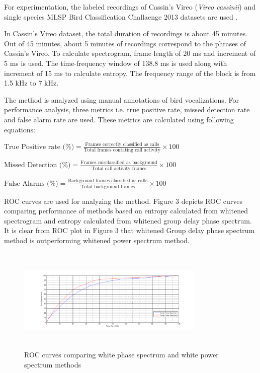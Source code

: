 \documentclass[a4paper]{article}
\begin{document}
For experimentation, the labeled recordings of Cassin’s Vireo (\textit{Vireo cassinii}) and single species MLSP Bird Classification Challaenge 2013 datasets are used \cite{data}. 

In Cassin's Vireo dataset, the total duration of recordings is about 45 minutes. Out of 45 minutes, about 5 minutes of recordings correspond to the phrases of Cassin's Vireo. To calculate spectrogram, frame length of 20 ms and increment of  
5 ms is used. The time-frequency window of 138.8 ms is used along with increment of 15 ms to calculate entropy. The frequency range of the block is from 1.5 kHz to 7 kHz.  

The method is analyzed using manual annotations of bird vocalizations. For performance analysis, three metrics i.e. true positive rate, missed detection rate and false alarm rate are used. These metrics are calculated using following equations:\newline



$\text{True Positive rate (\%)}=\frac{\text{Frames correctly classified as calls}} {\text{Total frames contating call activity}} \times 100$\newline


$\text{Missed Detection (\%)}=\frac{\text{Frames  misclassified as background}} {\text{Total call activity frames}} \times 100$\newline

$\text{False Alarms (\%)}=\frac{\text{Background  frames classified as calls}} {\text{Total background frames}} \times 100$ \newline



 ROC curves are used for analyzing the method. Figure 3 depicts ROC curves comparing performance of methods based on entropy calculated from whitened spectrogram and entropy calculated from whitened group delay phase spectrum. It is clear from ROC plot in Figure 3 that whitened Group delay phase spectrum method is outperforming whitened power spectrum method.


\begin{figure}[!ht]
	\centering
	\includegraphics[width=9cm, height=5cm]{Power_vs_phase_white}
	\caption{ROC curves comparing white phase spectrum and white power spectrum methods}   
\end{figure} 
\end{document}

